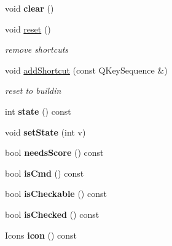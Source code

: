 \begin{DoxyCompactItemize}
void {\bfseries clear} ()
\item 
\mbox{\label{class_ms_1_1_shortcut_a962712890df6d5d071021c38e414983c}} 
void \hyperlink{class_ms_1_1_shortcut_a962712890df6d5d071021c38e414983c}{reset} ()
\begin{DoxyCompactList}\small\item\em remove shortcuts \end{DoxyCompactList}\item 
\mbox{\label{class_ms_1_1_shortcut_a58d98fc9e757924f366c99224fb1583b}} 
void \hyperlink{class_ms_1_1_shortcut_a58d98fc9e757924f366c99224fb1583b}{add\+Shortcut} (const Q\+Key\+Sequence \&)
\begin{DoxyCompactList}\small\item\em reset to buildin \end{DoxyCompactList}\item 
\mbox{\label{class_ms_1_1_shortcut_a05a2308f980f27bee250c7dd8535c67b}} 
int {\bfseries state} () const
\item 
\mbox{\label{class_ms_1_1_shortcut_ad4fb69c3bf6f2982a89c1c7a098ae9e1}} 
void {\bfseries set\+State} (int v)
\item 
\mbox{\label{class_ms_1_1_shortcut_a30d839239933ad71d144c965de227361}} 
bool {\bfseries needs\+Score} () const
\item 
\mbox{\label{class_ms_1_1_shortcut_a594fa61781c81534a9eead9cce0d00ee}} 
bool {\bfseries is\+Cmd} () const
\item 
\mbox{\label{class_ms_1_1_shortcut_ab918c7055a75fd321e7dc392484ff9ba}} 
bool {\bfseries is\+Checkable} () const
\item 
\mbox{\label{class_ms_1_1_shortcut_a1381aa9f7e0d7b758c52e190ee83ca97}} 
bool {\bfseries is\+Checked} () const
\item 
\mbox{\label{class_ms_1_1_shortcut_a65e4bf36e158679765f0a60f9d761b4c}} 
Icons {\bfseries icon} () const
\item 

\end{DoxyCompactItemize}
